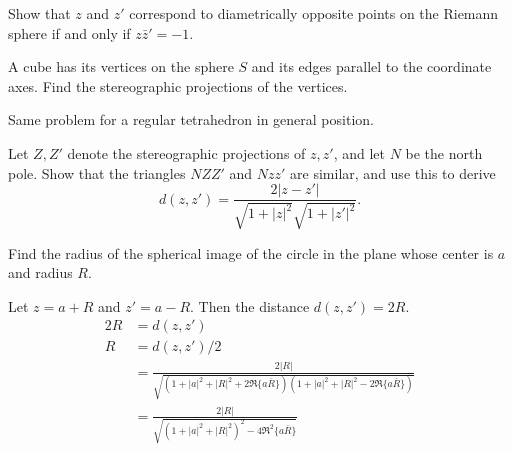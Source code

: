 \begin{exercise}
\item
  Show that \(z\) and \(z'\) correspond to diametrically opposite points on the
  Riemann sphere if and only if \(z\bar{z}' = -1\).
\item
  A cube has its vertices on the sphere \(S\) and its edges parallel to the
  coordinate axes.
  Find the stereographic projections of the vertices.
\item
  Same problem for a regular tetrahedron in general position.
\item
  Let \(Z,Z'\) denote the stereographic projections of \(z,z'\), and let \(N\)
  be the north pole.
  Show that the triangles \(NZZ'\) and \(Nzz'\) are similar, and use this to
  derive
  \[
  d(z, z') = \frac{2\lvert z - z'\rvert}{\sqrt{1 + \lvert z\rvert^2}
    \sqrt{1 + \lvert z'\rvert^2}}.
  \]
\item
  Find the radius of the spherical image of the circle in the plane whose
  center is \(a\) and radius \(R\).
  \par\smallskip
  Let \(z = a + R\) and \(z' = a - R\).
  Then the distance \(d(z,z') = 2R\).
  \begin{align*}
    2R & = d(z,z')\\
    R & = d(z,z')/2\\
       & = \frac{2\lvert R\rvert}
         {\sqrt{(1 + \lvert a\rvert^2 + \lvert R\rvert^2 + 2\Re\{a\bar{R}\})
         (1 + \lvert a\rvert^2 + \lvert R\rvert^2 - 2\Re\{a\bar{R}\})}}\\
       & = \frac{2\lvert R\rvert}
         {\sqrt{(1 + \lvert a\rvert^2 + \lvert R\rvert^2)^2 -
         4\Re^2\{a\bar{R}\}}}
  \end{align*}
\end{exercise}

